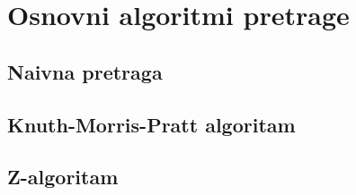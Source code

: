 \section{Osnovni algoritmi pretrage}

\subsection{Naivna pretraga}

\subsection{Knuth-Morris-Pratt algoritam}

\subsection{Z-algoritam}
